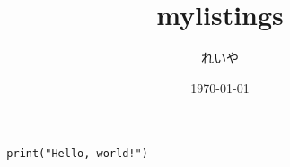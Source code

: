 \documentclass[a4paper,11pt]{jsarticle}
\begin{document}
\title{mylistings}
\author{れいや}
\date{\today}
\maketitle

\begin{lstlisting}
  print("Hello, world!")
\end{lstlisting}
\end{document}
